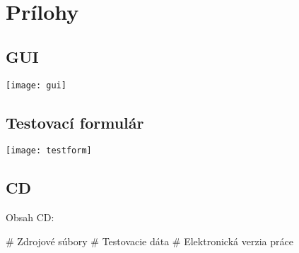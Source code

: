 \appendix
\chapter{Prílohy}

\section{GUI}
{ \hspace*{-0.3in}
\texttt{[image: gui]} 
}

\section{Testovací formulár}
\label{sec:testform}
{
\hspace*{-1in}
\texttt{[image: testform]}
}
% 


\section{CD}
Obsah CD:
\begin{easylist}[itemize]
	# Zdrojové súbory
	# Testovacie dáta
	# Elektronická verzia práce
\end{easylist}